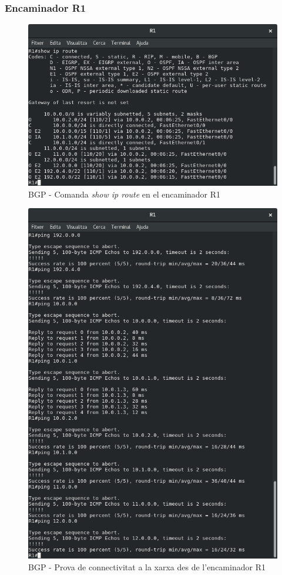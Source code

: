 \documentclass[10pt]{article}
\begin{document}
\subsubsection{Encaminador R1}
\begin{figure}[H]
\begin{center}
\includegraphics[scale=0.4]{Images/bgp-R1-route.png}
\caption{BGP - Comanda \textit{show ip route} en el encaminador R1}
\end{center}
\end{figure}
\begin{figure}[H]
\begin{center}
\includegraphics[scale=0.4]{Images/bgp-R1-conectivity.png}
\caption{BGP - Prova de connectivitat a la xarxa des de l'encaminador R1}
\end{center}
\end{figure}
\end{document}
